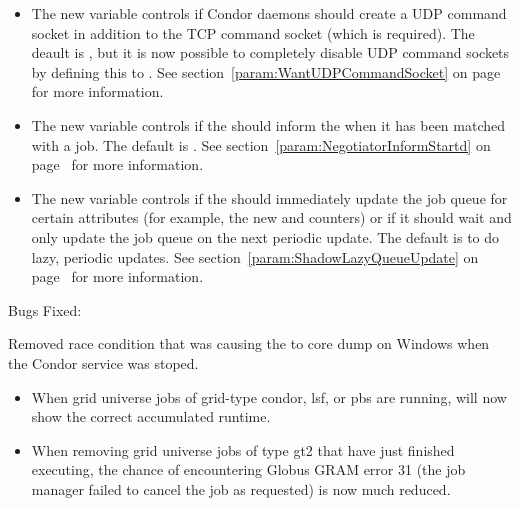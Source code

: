 \begin{itemize}

\item The new variable  controls
  if Condor daemons should create a UDP command socket in addition to
  the TCP command socket (which is required).
  The deault is , but it is now possible to completely
  disable UDP command sockets by defining this to .
  See section~\ref{param:WantUDPCommandSocket} on
  page~\pageref{param:WantUDPCommandSocket} for more information.

\item The new variable  controls if
  the  should inform the  when it
  has been matched with a job.
  The default is .
  See section~\ref{param:NegotiatorInformStartd} on
  page~\pageref{param:NegotiatorInformStartd} for more information.

\item The new variable  controls if
  the  should immediately update the job queue for
  certain attributes (for example, the new  and
   counters) or if it should wait and only
  update the job queue on the next periodic update.
  The default is  to do lazy, periodic updates.
  See section~\ref{param:ShadowLazyQueueUpdate} on
  page~\pageref{param:ShadowLazyQueueUpdate} for more information.

\end{itemize}

\noindent Bugs Fixed:

\item Removed race condition that was causing the  to core
  dump on Windows when the Condor service was stoped.

\begin{itemize}

\item When grid universe jobs of grid-type condor, lsf, or pbs are running,
 will now show the correct accumulated runtime.

\item When removing grid universe jobs of type gt2 that have just finished
executing, the chance of encountering Globus GRAM error 31 (the job manager
failed to cancel the job as requested) is now much reduced.

\end{itemize}

